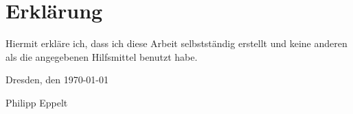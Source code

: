  

\section*{\vfill{} \thispagestyle{empty}
Erklärung}

Hiermit erkläre ich, dass ich diese Arbeit selbstständig erstellt
und keine anderen als die angegebenen Hilfsmittel benutzt habe.
\bigskip{}

\noindent Dresden, den \today %
\vspace{2.5cm}

\noindent Philipp Eppelt \cleardoublepage{}
